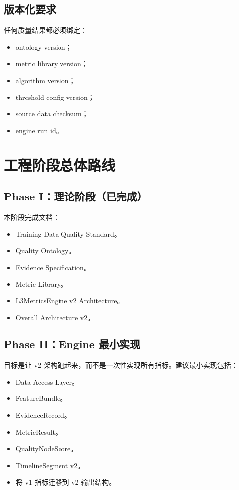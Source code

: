 \documentclass[UTF8,zihao=-4]{ctexart}
\begin{document}
\subsection{版本化要求}

任何质量结果都必须绑定：

\begin{itemize}
\item ontology version；
\item metric library version；
\item algorithm version；
\item threshold config version；
\item source data checksum；
\item engine run id。
\end{itemize}

\section{工程阶段总体路线}

\subsection{Phase I：理论阶段（已完成）}

本阶段完成文档：

\begin{itemize}
\item Training Data Quality Standard。
\item Quality Ontology。
\item Evidence Specification。
\item Metric Library。
\item L3MetricsEngine v2 Architecture。
\item Overall Architecture v2。
\end{itemize}

\subsection{Phase II：Engine 最小实现}

目标是让 v2 架构跑起来，而不是一次性实现所有指标。建议最小实现包括：

\begin{itemize}
\item Data Access Layer。
\item FeatureBundle。
\item EvidenceRecord。
\item MetricResult。
\item QualityNodeScore。
\item TimelineSegment v2。
\item 将 v1 指标迁移到 v2 输出结构。
\end{itemize}
\end{document}
